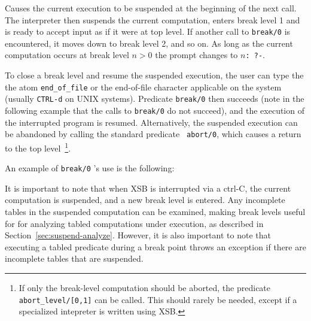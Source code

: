 \begin{description}

%
Causes the current execution to be suspended at the beginning of the
next call.  The interpreter then suspends the current computation,
enters break level 1 and is ready to accept input as if it were at top
level.  If another call to {\tt break/0} is encountered, it moves down
to break level 2, and so on.  As long as the current computation
occurs at break level $n>0$ the prompt changes to {\tt $n$: ?-}.  

To close a break level and resume the suspended execution, the user
can type the the atom {\tt end\_of\_file} or the end-of-file character
applicable on the system (usually {\tt CTRL-d} on UNIX systems).
Predicate {\tt break/0} then succeeds (note in the following example
that the calls to {\tt break/0} do not succeed), and the execution of
the interrupted program is resumed.  Alternatively, the suspended
execution can be abandoned by calling the standard predicate {\tt
  abort/0}, which causes a return to the top level~\footnote{If only
  the break-level computation should be aborted, the predicate {\tt
    abort\_level/[0,1]} can be called.  This should rarely be needed,
  except if a specialized intepreter is written using XSB.}.

    An example of {\tt break/0} 's use is the following:


It is important to note that when XSB is interrupted via a ctrl-C, the
current computation is suspended, and a new break level is entered.
Any incomplete tables in the suspended computation can be examined,
making break levels useful for for analyzing tabled computations under
execution, as described in Section~\ref{sec:suspend-analyze}.
However, it is also important to note that executing a tabled
predicate during a break point throws an exception if there are
incomplete tables that are suspended.



\end{description}

